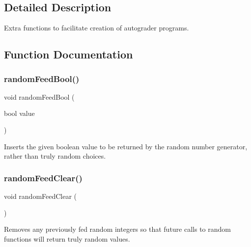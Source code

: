 \subsection{Detailed Description}
Extra functions to facilitate creation of autograder programs. 

\subsection{Function Documentation}
\mbox{\label{namespaceautograder_a9dc13baafecf9d7782bb8fe7e23201ca}} 
\subsubsection{\texorpdfstring{random\+Feed\+Bool()}{randomFeedBool()}}
{\footnotesize\ttfamily void random\+Feed\+Bool (\begin{DoxyParamCaption}\item[{bool}]{value }\end{DoxyParamCaption})}



Inserts the given boolean value to be returned by the random number generator, rather than truly random choices. 

\mbox{\label{namespaceautograder_a448f8778ed42e2d2939d1732b7bd5748}} 
\subsubsection{\texorpdfstring{random\+Feed\+Clear()}{randomFeedClear()}}
{\footnotesize\ttfamily void random\+Feed\+Clear (\begin{DoxyParamCaption}{ }\end{DoxyParamCaption})}



Removes any previously \textquotesingle{}fed\textquotesingle{} random integers so that future calls to random functions will return truly random values. 

\mbox{\label{namespaceautograder_a4373a6a00739bdae4c357b55efaccabd}} 

